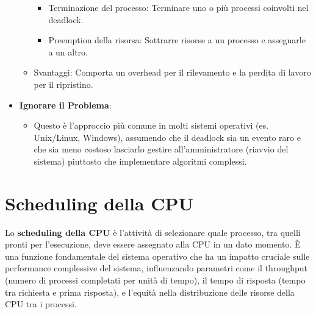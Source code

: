 \begin{itemize}
\begin{itemize}
                \begin{itemize} %
                    \item Terminazione del processo: Terminare uno o più processi coinvolti nel deadlock.
                    \item Preemption della risorsa: Sottrarre risorse a un processo e assegnarle a un altro.
                \end{itemize} %
            \item Svantaggi: Comporta un overhead per il rilevamento e la perdita di lavoro per il ripristino.
        \end{itemize} %
    \item \textbf{Ignorare il Problema}:
        \begin{itemize} %
            \item Questo è l'approccio più comune in molti sistemi operativi (es. Unix/Linux, Windows), assumendo che il deadlock sia un evento raro e che sia meno costoso lasciarlo gestire all'amministratore (riavvio del sistema) piuttosto che implementare algoritmi complessi.
        \end{itemize} %
\end{itemize}

\section{Scheduling della CPU}
Lo \textbf{scheduling della CPU} è l'attività di selezionare quale processo, tra quelli pronti per l'esecuzione, deve essere assegnato alla CPU in un dato momento. È una funzione fondamentale del sistema operativo che ha un impatto cruciale sulle performance complessive del sistema, influenzando parametri come il throughput (numero di processi completati per unità di tempo), il tempo di risposta (tempo tra richiesta e prima risposta), e l'equità nella distribuzione delle risorse della CPU tra i processi.

